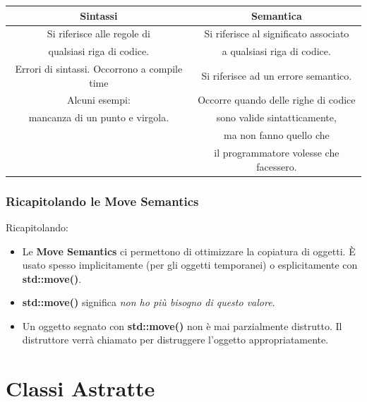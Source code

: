 \begin{tabular}{|c|c|}
	\hline
	\textbf{Sintassi} & \textbf{Semantica} \\
	\hline
	\textsf{\small Si riferisce alle regole di } & \textsf{\small Si riferisce al significato associato } \\
	\textsf{\small qualsiasi riga di codice.} & \textsf{\small a qualsiasi riga di codice.} \\
	\hline
	\textsf{\small Errori di sintassi. Occorrono a compile time} & \textsf{\small Si riferisce ad un errore semantico. } \\
	\textsf{\small Alcuni esempi: } & \textsf{\small Occorre quando delle righe di codice } \\
	\textsf{\small mancanza di un punto e virgola.} & \textsf{\small sono valide sintatticamente,} \\
	\textsf{\small } & \textsf{\small ma non fanno quello che } \\
	\textsf{\small } & \textsf{\small il programmatore volesse che facessero.} \\
	\hline
\end{tabular}

\subsubsection{Ricapitolando le Move Semantics}

\textsf{\small Ricapitolando: } \\

\begin{itemize}
	\item \textsf{\small Le \textbf{Move Semantics} ci permettono di ottimizzare la copiatura di oggetti. È usato spesso implicitamente (per gli oggetti temporanei) o esplicitamente con \textbf{std::move()}.}
	\item \textsf{\small \textbf{std::move()} significa \emph{non ho più bisogno di questo valore}.}
	\item \textsf{\small Un oggetto segnato con \textbf{std::move()} non è mai parzialmente distrutto. Il distruttore verrà chiamato per distruggere l'oggetto appropriatamente.}
\end{itemize}


\newpage


\section{Classi Astratte}

